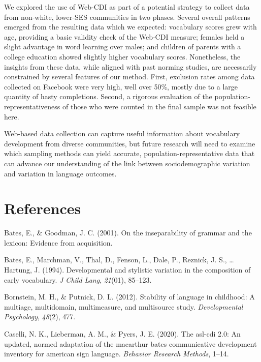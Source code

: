 \documentclass[
  english,
  ,man,floatsintext]{apa6}
\begin{document}
We explored the use of Web-CDI as part of a potential strategy to collect data from non-white, lower-SES communities in two phases. Several overall patterns emerged from the resulting data which we expected: vocabulary scores grew with age, providing a basic validity check of the Web-CDI measure; females held a slight advantage in word learning over males; and children of parents with a college education showed slightly higher vocabulary scores. Nonetheless, the insights from these data, while aligned with past norming studies, are necessarily constrained by several features of our method. First, exclusion rates among data collected on Facebook were very high, well over 50\%, mostly due to a large quantity of hasty completions. Second, a rigorous evaluation of the population-representativeness of those who were counted in the final sample was not feasible here.

Web-based data collection can capture useful information about vocabulary development from diverse communities, but future research will need to examine which sampling methods can yield accurate, population-representative data that can advance our understanding of the link between sociodemographic variation and variation in language outcomes.

\newpage

\hypertarget{references}{%
\section{References}\label{references}}

\begingroup
\setlength{\parindent}{-0.5in}
\setlength{\leftskip}{0.5in}

\hypertarget{refs}{}
\leavevmode\hypertarget{ref-Bates2001}{}%
Bates, E., \& Goodman, J. C. (2001). On the inseparability of grammar and the lexicon: Evidence from acquisition.

\leavevmode\hypertarget{ref-bates1994}{}%
Bates, E., Marchman, V., Thal, D., Fenson, L., Dale, P., Reznick, J. S., \ldots{} Hartung, J. (1994). Developmental and stylistic variation in the composition of early vocabulary. \emph{J Child Lang}, \emph{21}(01), 85--123.

\leavevmode\hypertarget{ref-bornstein2012}{}%
Bornstein, M. H., \& Putnick, D. L. (2012). Stability of language in childhood: A multiage, multidomain, multimeasure, and multisource study. \emph{Developmental Psychology}, \emph{48}(2), 477.

\leavevmode\hypertarget{ref-Caselli2020}{}%
Caselli, N. K., Lieberman, A. M., \& Pyers, J. E. (2020). The asl-cdi 2.0: An updated, normed adaptation of the macarthur bates communicative development inventory for american sign language. \emph{Behavior Research Methods}, 1--14.
\end{document}
